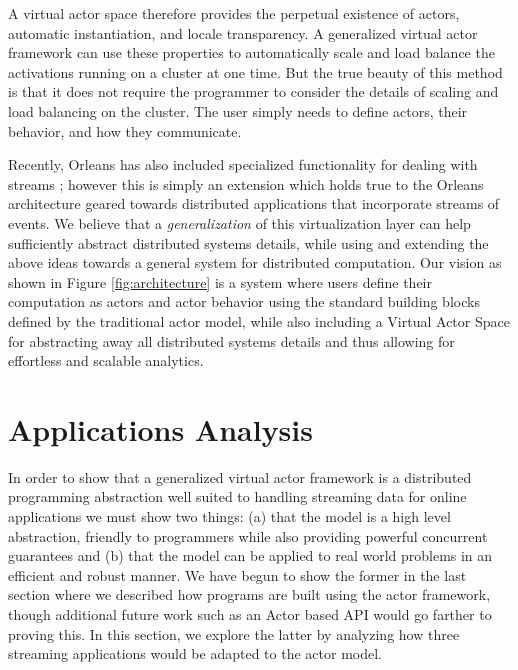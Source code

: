 \documentclass[conference,twocolumn,10pt]{IEEEtran}
\begin{document}
A virtual actor space therefore provides the perpetual existence of actors, automatic instantiation, and locale transparency. A generalized virtual actor framework can use these properties to automatically scale and load balance the activations running on a cluster at one time. But the true beauty of this method is that it does not require the programmer to consider the details of scaling and load balancing on the cluster. The user simply needs to define actors, their behavior, and how they communicate.

Recently, Orleans has also included specialized functionality for dealing with streams \cite{research_microsoft_2015}; however this is simply an extension which holds true to the Orleans architecture geared towards distributed applications that incorporate streams of events. We believe that a \textit{generalization} of this virtualization layer can help sufficiently abstract distributed systems details, while using and extending the above ideas towards a general  system for distributed computation. Our vision as shown in Figure \ref{fig:architecture} is a system where users define their computation as actors and actor behavior using the standard building blocks defined by the traditional actor model, while also including a Virtual Actor Space for abstracting away all distributed systems details and thus allowing for effortless and scalable analytics.




\section{Applications Analysis}

In order to show that a generalized virtual actor framework is a distributed programming abstraction well suited to handling streaming data for online applications we must show two things: (a) that the model is a high level abstraction, friendly to programmers while also providing powerful concurrent guarantees and (b) that the model can be applied to real world problems in an efficient and robust manner. We have begun to show the former in the last section where we described how programs are built using the actor framework, though additional future work such as an Actor based API would go farther to proving this. In this section, we explore the latter by analyzing how three streaming applications would be adapted to the actor model.
\end{document}

